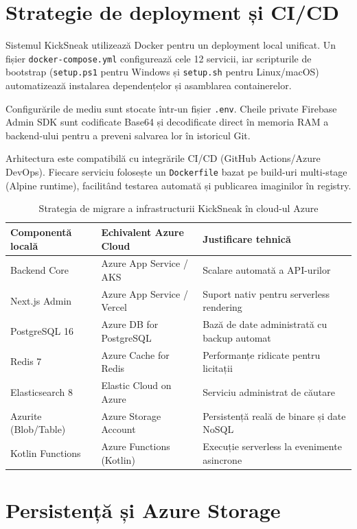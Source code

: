 \section{Strategie de deployment și CI/CD}

Sistemul KickSneak utilizează Docker pentru un deployment local unificat. Un fișier \texttt{docker-compose.yml} configurează cele 12 servicii, iar scripturile de bootstrap (\texttt{setup.ps1} pentru Windows și \texttt{setup.sh} pentru Linux/macOS) automatizează instalarea dependențelor și asamblarea containerelor.

Configurările de mediu sunt stocate într-un fișier \texttt{.env}. Cheile private Firebase Admin SDK sunt codificate Base64 și decodificate direct în memoria RAM a backend-ului pentru a preveni salvarea lor în istoricul Git.

Arhitectura este compatibilă cu integrările CI/CD (GitHub Actions/Azure DevOps). Fiecare serviciu folosește un \texttt{Dockerfile} bazat pe build-uri multi-stage (Alpine runtime), facilitând testarea automată și publicarea imaginilor în registry.

\begin{table}[htbp]
\centering
\small
\begin{tabular}{llp{7cm}}
\toprule
\textbf{Componentă locală} & \textbf{Echivalent Azure Cloud} & \textbf{Justificare tehnică} \\
\midrule
Backend Core & Azure App Service / AKS & Scalare automată a API-urilor \\
Next.js Admin & Azure App Service / Vercel & Suport nativ pentru serverless rendering \\
PostgreSQL 16 & Azure DB for PostgreSQL & Bază de date administrată cu backup automat \\
Redis 7 & Azure Cache for Redis & Performanțe ridicate pentru licitații \\
Elasticsearch 8 & Elastic Cloud on Azure & Serviciu administrat de căutare \\
Azurite (Blob/Table) & Azure Storage Account & Persistență reală de binare și date NoSQL \\
Kotlin Functions & Azure Functions (Kotlin) & Execuție serverless la evenimente asincrone \\
\bottomrule
\end{tabular}
\caption{Strategia de migrare a infrastructurii KickSneak în cloud-ul Azure}
\label{tab:migrare_cloud}
\end{table}

\section{Persistență și Azure Storage}

